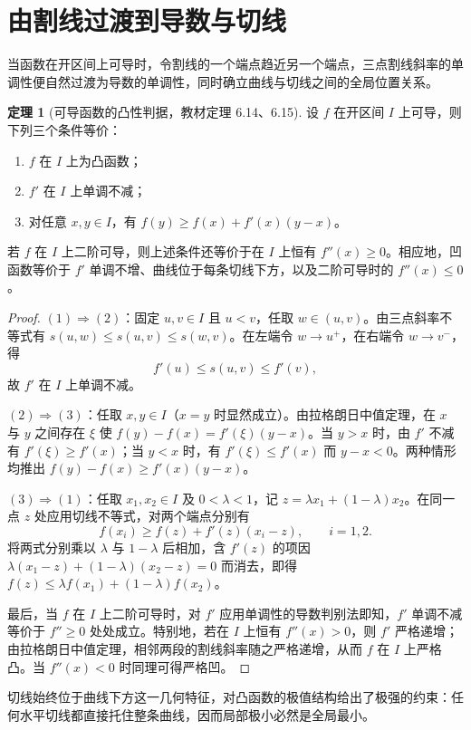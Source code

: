 \documentclass[UTF8,fontset=fandol,a4paper,12pt]{ctexart}
\theoremstyle{definition}
\newtheorem{theorem}{定理}[section]
\begin{document}
\section{由割线过渡到导数与切线}
当函数在开区间上可导时，令割线的一个端点趋近另一个端点，三点割线斜率的单调性便自然过渡为导数的单调性，同时确立曲线与切线之间的全局位置关系。

\begin{theorem}[可导函数的凸性判据，教材定理 6.14、6.15]
设 $f$ 在开区间 $I$ 上可导，则下列三个条件等价：
\begin{enumerate}
\item $f$ 在 $I$ 上为凸函数；
\item $f'$ 在 $I$ 上单调不减；
\item 对任意 $x,y\in I$，有 $f(y)\ge f(x)+f'(x)(y-x)$。
\end{enumerate}
若 $f$ 在 $I$ 上二阶可导，则上述条件还等价于在 $I$ 上恒有 $f''(x)\ge0$。相应地，凹函数等价于 $f'$ 单调不增、曲线位于每条切线下方，以及二阶可导时的 $f''(x)\le0$。
\end{theorem}

\begin{proof}
$(1)\Rightarrow(2)$：固定 $u,v\in I$ 且 $u<v$，任取 $w\in(u,v)$。由三点斜率不等式有 $s(u,w)\le s(u,v)\le s(w,v)$。在左端令 $w\to u^+$，在右端令 $w\to v^-$，得
\[
 f'(u)\le s(u,v)\le f'(v),
\]
故 $f'$ 在 $I$ 上单调不减。

$(2)\Rightarrow(3)$：任取 $x,y\in I$（$x=y$ 时显然成立）。由拉格朗日中值定理，在 $x$ 与 $y$ 之间存在 $\xi$ 使 $f(y)-f(x)=f'(\xi)(y-x)$。当 $y>x$ 时，由 $f'$ 不减有 $f'(\xi)\ge f'(x)$；当 $y<x$ 时，有 $f'(\xi)\le f'(x)$ 而 $y-x<0$。两种情形均推出 $f(y)-f(x)\ge f'(x)(y-x)$。

$(3)\Rightarrow(1)$：任取 $x_1,x_2\in I$ 及 $0<\lambda<1$，记 $z=\lambda x_1+(1-\lambda)x_2$。在同一点 $z$ 处应用切线不等式，对两个端点分别有
\[
 f(x_i)\ge f(z)+f'(z)(x_i-z),\qquad i=1,2.
\]
将两式分别乘以 $\lambda$ 与 $1-\lambda$ 后相加，含 $f'(z)$ 的项因 $\lambda(x_1-z)+(1-\lambda)(x_2-z)=0$ 而消去，即得 $f(z)\le\lambda f(x_1)+(1-\lambda)f(x_2)$。

最后，当 $f$ 在 $I$ 上二阶可导时，对 $f'$ 应用单调性的导数判别法即知，$f'$ 单调不减等价于 $f''\ge0$ 处处成立。特别地，若在 $I$ 上恒有 $f''(x)>0$，则 $f'$ 严格递增；由拉格朗日中值定理，相邻两段的割线斜率随之严格递增，从而 $f$ 在 $I$ 上严格凸。当 $f''(x)<0$ 时同理可得严格凹。
\end{proof}

切线始终位于曲线下方这一几何特征，对凸函数的极值结构给出了极强的约束：任何水平切线都直接托住整条曲线，因而局部极小必然是全局最小。
\end{document}
